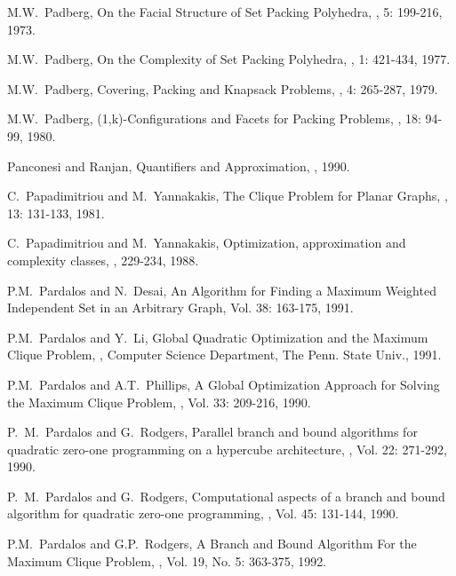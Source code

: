 \begin{thebibliography}{10}
M.W.~Padberg,
\newblock On the Facial Structure of Set Packing Polyhedra,
, 5: 199-216, 1973.

M.W.~Padberg,
\newblock On the Complexity of Set Packing Polyhedra,
, 1: 421-434, 1977.

M.W.~Padberg,
\newblock Covering, Packing and Knapsack Problems,
, 4: 265-287, 1979.

M.W.~Padberg,
\newblock (1,k)-Configurations and Facets for Packing Problems,
, 18: 94-99, 1980.

Panconesi and Ranjan,
\newblock Quantifiers and Approximation,
, 1990.

C.~Papadimitriou and M.~Yannakakis,
\newblock The Clique Problem for Planar Graphs,
, 13: 131-133, 1981.

C.~Papadimitriou and M.~Yannakakis,
\newblock Optimization, approximation and complexity classes,
, 229-234,
1988.

P.M.~Pardalos and N.~Desai,
\newblock An Algorithm for Finding a Maximum Weighted Independent
Set in an Arbitrary Graph,
 Vol. 38: 163-175, 1991.

P.M.~Pardalos and Y.~Li,
\newblock Global Quadratic Optimization and the Maximum Clique
Problem,
, Computer Science Department, The
Penn. State Univ., 1991.

P.M.~Pardalos and A.T.~Phillips,
\newblock A Global Optimization Approach for Solving the Maximum
Clique Problem,
, Vol. 33: 209-216, 1990.

P.~M.~Pardalos and G.~Rodgers,
\newblock Parallel branch and bound algorithms for quadratic
zero-one programming on a hypercube architecture,
, Vol. 22: 271-292,  
1990.

P.~M.~Pardalos and G.~Rodgers,
\newblock Computational aspects of a branch and bound algorithm for
quadratic zero-one programming,
, Vol. 45: 131-144, 1990.

P.M.~Pardalos and G.P.~Rodgers,
\newblock A Branch and Bound Algorithm For the Maximum Clique
Problem,
, Vol. 19, No. 5:
363-375, 1992.


\end{thebibliography}
